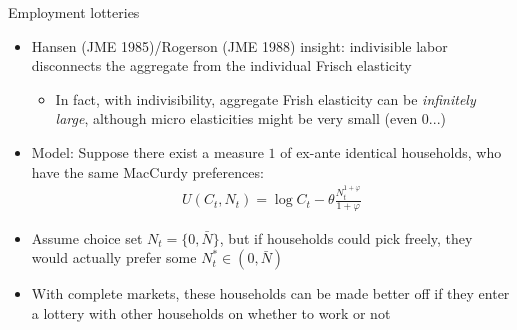 \documentclass[9pt,xcolor={dvipsnames}]{beamer}
\newcommand{\bit}{\begin{itemize}}
\newcommand{\eit}{\end{itemize}}
\newcommand{\bc}{\color{blue}}
\begin{document}
%
%
%
%
%

\begin{frame}{Employment lotteries}

\bit
\setlength\itemsep{1.5em}

\item Hansen (JME 1985)/Rogerson (JME 1988) insight: {\bc indivisible labor} disconnects the aggregate from the individual Frisch elasticity
\bit
	\item In fact, with indivisibility, aggregate Frish elasticity can be \emph{infinitely large}, although micro elasticities might be very small (even 0...)	
\eit

\item Model: Suppose there exist a measure $1$ of ex-ante identical households, who have the same MacCurdy preferences:
\begin{eqnarray}
U(C_t, N_t) = \log C_t - \theta \frac{N_t^{1+\varphi}}{1+\varphi}\nonumber 
\end{eqnarray}

\item Assume choice set $N_t = \{0, \bar N\}$, but if households could pick freely, they would actually prefer some $N^*_t \in (0, \bar N)$

\item With {\bc complete markets}, these households can be made better off if they enter a lottery with other households on whether to work or not


\eit

\end{frame}
\end{document}
